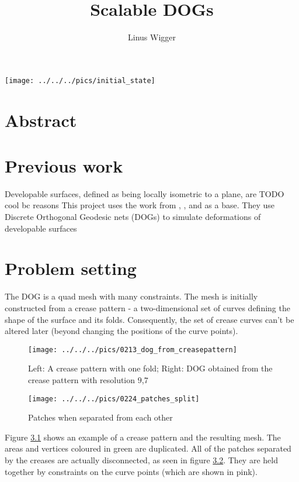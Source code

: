 \documentclass[a4paper,twoside,12pt,nochapterprefix]{scrbook}
\title{Scalable DOGs}
\author{Linus Wigger}
\begin{document}
\maketitle
{\centering \texttt{[image: ../../../pics/initial\_state]}\\}

\chapter{Abstract}\label{sec:abstract}
\chapter{Previous work}\label{sec:prev_work}
Developable surfaces, defined as being locally isometric to a plane, are TODO cool bc reasons
This project uses the work from \cite{Rabinovich:DogNets:2018}, \cite{Rabinovich:DogShapeSpace:2018}, and \cite{Rabinovich:CurvedFolds:2019} as a base.
They use Discrete Orthogonal Geodesic nets (DOGs) to simulate deformations of developable surfaces

\chapter{Problem setting}\label{sec:problem}
The DOG is a quad mesh with many constraints. The mesh is initially constructed from a crease pattern - a two-dimensional set of curves defining the shape of the surface and its folds. Consequently, the set of crease curves can't be altered later (beyond changing the positions of the curve points).\newline
\begin{figure}
    \centering
    \setlength{\tabcolsep}{0.0130\linewidth}
    \texttt{[image: ../../../pics/0213\_dog\_from\_creasepattern]}
    \caption{Left: A crease pattern with one fold; Right: DOG obtained from the crease pattern with resolution $9$,$7$
      \label{fig:dog_from_creasepattern}}
\end{figure}
\begin{figure}
    \centering
    \setlength{\tabcolsep}{0.0130\linewidth}
    \texttt{[image: ../../../pics/0224\_patches\_split]}
    \caption{Patches when separated from each other
      \label{fig:patches_split}}
\end{figure}
Figure \ref{fig:dog_from_creasepattern} shows an example of a crease pattern and the resulting mesh. The areas and vertices coloured in green are duplicated. All of the patches separated by the creases are actually disconnected, as seen in figure \ref{fig:patches_split}. They are held together by constraints on the curve points (which are shown in pink).\newline
\end{document}
